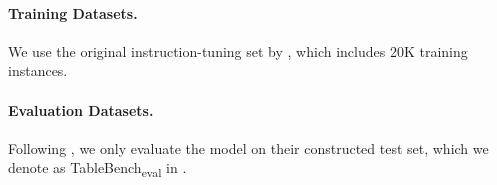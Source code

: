\documentclass[11pt]{article}
\begin{document}


\paragraph{Training Datasets.}
We use the original instruction-tuning set by \citet{wu2024tablebenchcomprehensivecomplexbenchmark}, which includes 20K training instances.

\paragraph{Evaluation Datasets.}
Following \citet{wu2024tablebenchcomprehensivecomplexbenchmark}, we only evaluate the model on their constructed test set, which we denote as TableBench\textsubscript{eval} in .
\end{document}
